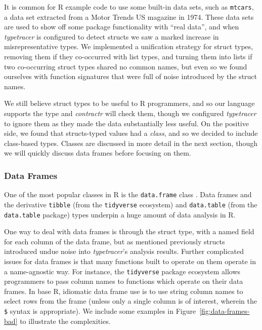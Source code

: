 \documentclass[acmsmall,review,anonymous]{acmart}\settopmatter{printfolios=true,printccs=false,printacmref=false}
\newcommand{\code}[1]{{\lstinline[style=Rin]!#1!}\xspace}
\newcommand{\contractr}{\emph{contractr}\xspace} %
\newcommand{\typetracer}{\emph{typetracer}\xspace} %
\begin{document}
It is common for R example code to use some built-in data sets, such as \code{mtcars}, a data set extracted from a Motor Trends US magazine in 1974.
These data sets are used to show off some package functionality with ``real data'', and when \typetracer is configured to detect structs we saw a marked increase in misrepresentative types.
We implemented a unification strategy for struct types, removing them if they co-occurred with list types, and turning them into lists if two co-occurring struct types shared no common names, but even so we found ourselves with function signatures that were full of noise introduced by the struct names.

We still believe struct types to be useful to R programmers, and so our language supports the type and \contractr will check them, though we configured \typetracer to ignore them as they made the data substantially less useful.
On the positive side, we found that  structs-typed values had a {\it class}, and so we decided to include class-based types.
Classes are discussed in more detail in the next section, though we will quickly discuss data frames before focusing on them. 

%
%
\subsubsection{Data Frames}

One of the most popular classes in R is the \code{data.frame} class .
Data frames and the derivative \code{tibble} (from the \code{tidyverse} ecosystem) and \code{data.table} (from the \code{data.table} package) types underpin a huge amount of data analysis in R.

One way to deal with data frames is through the struct type, with a named field for each column of the data frame, but as mentioned previously structs introduced undue noise into \typetracer's analysis results. 
Further complicated issues for data frames is that many functions built to operate on them operate in a name-agnostic way.
For instance, the \code{tidyverse} package ecosystem allows programmers to pass column names to functions which operate on their data frames.
In base R, idiomatic data frame use is to use string column names to select rows from the frame (unless only a single column is of interest, wherein the \code{$} syntax is appropriate). 
We include some examples in Figure~\ref{fig:data-frames-bad} to illustrate the complexities.
\end{document}
